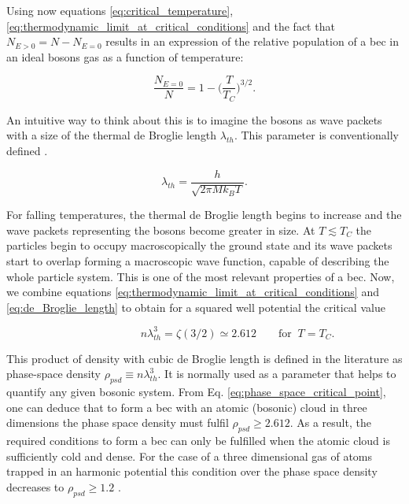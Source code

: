 Using now equations \eqref{eq:critical_temperature}, \eqref{eq:thermodynamic_limit_at_critical_conditions} and the fact that $N_{E>0} = N - N_{E=0}$ results in an expression of the relative population of a \ac{bec} in an ideal bosons gas as a function of temperature:

\begin{equation}\label{eq:bec_relative_population}
\frac{N_{E=0}}{N} = 1 - \bigg(\frac{T}{T_C}\bigg)^{3/2}.
\end{equation}

An intuitive way to think about this is to imagine the bosons as wave packets with a size of the thermal de Broglie length $\lambda_{th}$. This parameter is conventionally defined \cite{deBroglie1970}.

\begin{equation}\label{eq:de_Broglie_length}
\lambda_{th} = \frac{h}{\sqrt{2\pi Mk_B T}}.
\end{equation}

For falling temperatures, the thermal de Broglie length begins to increase and the wave packets representing the bosons become greater in size. At $T\lesssim T_C$ the particles begin to occupy macroscopically the ground state and its wave packets start to overlap forming a macroscopic wave function, capable of describing the whole particle system. This is one of the most relevant properties of a \ac{bec}. Now, we combine equations \ref{eq:thermodynamic_limit_at_critical_conditions} and \ref{eq:de_Broglie_length} to obtain for a squared well potential the critical value

\begin{equation}\label{eq:phase_space_critical_point}
\qquad\qquad\qquad n \lambda_{th}^3 = \zeta(3/2) \simeq 2.612 \qquad \textrm{for } \ T=T_C.
\end{equation}

This product of density with cubic de Broglie length is defined in the literature as phase-space density $\rho_{psd} \equiv n \lambda_{th}^3$. It is normally used as a parameter that helps to quantify any given bosonic system. From Eq. \eqref{eq:phase_space_critical_point}, one can deduce that to form a \ac{bec} with an atomic (bosonic) cloud in three dimensions the phase space density must fulfil $\rho_{psd} \geq 2.612$. As a result, the required conditions to form a \ac{bec} can only be fulfilled when the atomic cloud is sufficiently cold and dense. For the case of a three dimensional gas of atoms trapped in an harmonic potential this condition over the phase space density decreases to $\rho_{psd} \geq 1.2$ \cite{Pethick2008}. 

